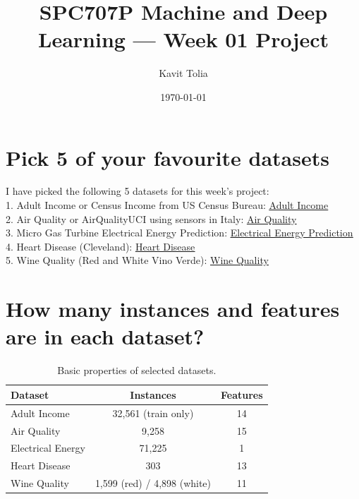 \documentclass[11pt]{article}
\title{SPC707P Machine and Deep Learning — Week 01 Project}
\author{Kavit Tolia}
\date{\today}
\begin{document}
\maketitle

\pagestyle{fancy}
\fancyhf{}%


\section{Pick 5 of your favourite datasets}
I have picked the following 5 datasets for this week's project: \\
1. Adult Income or Census Income from US Census Bureau: \href{https://archive.ics.uci.edu/dataset/2/adult}{\underline{Adult Income}} \\
2. Air Quality or AirQualityUCI using sensors in Italy: \href{https://archive.ics.uci.edu/dataset/360/air+quality}{\underline{Air Quality}} \\
3. Micro Gas Turbine Electrical Energy Prediction: \href{https://archive.ics.uci.edu/dataset/994/micro+gas+turbine+electrical+energy+prediction}{\underline{Electrical Energy Prediction}} \\
4. Heart Disease (Cleveland): \href{https://archive.ics.uci.edu/dataset/45/heart+disease}{\underline{Heart Disease}} \\
5. Wine Quality (Red and White Vino Verde): \href{https://archive.ics.uci.edu/dataset/186/wine+quality}{\underline{Wine Quality}} 

\section{How many instances and features are in each dataset?}
\begin{table}[h!]
\centering
\begin{tabular}{lcc}
\hline
Dataset & Instances & Features \\
\hline
Adult Income & 32,561 (train only) & 14 \\
Air Quality & 9,258 & 15 \\
Electrical Energy & 71,225 & 1 \\
Heart Disease & 303 & 13 \\
Wine Quality & 1,599 (red) / 4,898 (white) & 11 \\
\hline
\end{tabular}
\caption{Basic properties of selected datasets.}
\end{table}
\end{document}
